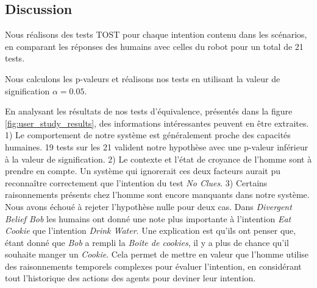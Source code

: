 \documentclass[a4paper,11pt,twoside]{StyleThese}
\begin{document}
\subsection{Discussion}
\label{discussion}
Nous réalisons des tests TOST pour chaque intention contenu dans les scénarios, en comparant les réponses des humains avec celles du robot pour un total de 21 tests.

Nous calculons les p-valeurs et réalisons nos tests en utilisant la valeur de signification $\alpha=0.05$.

En analysant les résultats de nos tests d'équivalence, présentés dans la figure \ref{fig:user_study_results}, des informations intéressantes peuvent en être extraites. 1) Le comportement de notre système est généralement proche des capacités humaines. 19 tests sur les 21 valident notre hypothèse avec une p-valeur inférieur à la valeur de signification. 2) Le contexte et l'état de croyance de l'homme sont à prendre en compte. Un système qui ignorerait ces deux facteurs aurait pu reconnaître correctement que l'intention du test \textit{No Clues}. 3) Certains raisonnements présents chez l'homme sont encore manquants dans notre système. Nous avons échoué à rejeter l'hypothèse nulle pour deux cas. Dans \textit{Divergent Belief Bob} les humains ont donné une note plus importante à l'intention \textit{Eat Cookie} que l'intention \textit{Drink Water}. Une explication est qu'ils ont penser que, étant donné que \textit{Bob} a rempli la \textit{Boîte de cookies}, il y a plus de chance qu'il souhaite manger un \textit{Cookie}. Cela permet de mettre en valeur que l'homme utilise des raisonnements temporels complexes pour évaluer l'intention, en considérant tout l'historique des actions des agents pour deviner leur intention.
\end{document}
